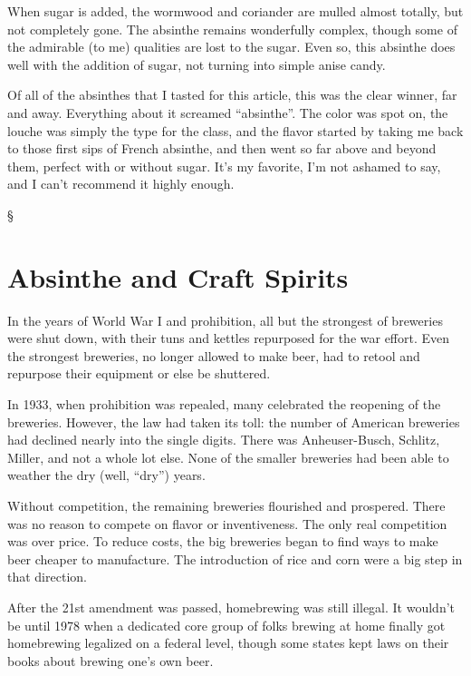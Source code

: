 \documentclass[12pt,letterpaper,oneside]{memoir}
\newcommand\secdiv{
  \begin{center}
    \S
  \end{center}
}
\begin{document}
  When sugar is added, the wormwood and coriander are mulled almost totally, but not completely gone.  The absinthe remains wonderfully complex, though some of the admirable (to me) qualities are lost to the sugar.  Even so, this absinthe does well with the addition of sugar, not turning into simple anise candy.

  Of all of the absinthes that I tasted for this article, this was the clear winner, far and away.  Everything about it screamed ``absinthe''.  The color was spot on, the louche was simply the type for the class, and the flavor started by taking me back to those first sips of French absinthe, and then went so far above and beyond them, perfect with or without sugar.  It's my favorite, I'm not ashamed to say, and I can't recommend it highly enough.

  \secdiv

  \section*{Absinthe and Craft Spirits}

  In the years of World War I and prohibition, all but the strongest of breweries were shut down, with their tuns and kettles repurposed for the war effort.  Even the strongest breweries, no longer allowed to make beer, had to retool and repurpose their equipment or else be shuttered.

  In 1933, when prohibition was repealed, many celebrated the reopening of the breweries.  However, the law had taken its toll: the number of American breweries had declined nearly into the single digits.  There was Anheuser-Busch, Schlitz, Miller, and not a whole lot else.  None of the smaller breweries had been able to weather the dry (well, ``dry'') years.

  Without competition, the remaining breweries flourished and prospered.  There was no reason to compete on flavor or inventiveness.  The only real competition was over price.  To reduce costs, the big breweries began to find ways to make beer cheaper to manufacture.  The introduction of rice and corn were a big step in that direction.

  After the 21st amendment was passed, homebrewing was still illegal.  It wouldn't be until 1978 when a dedicated core group of folks brewing at home finally got homebrewing legalized on a federal level, though some states kept laws on their books about brewing one's own beer.
\end{document}
